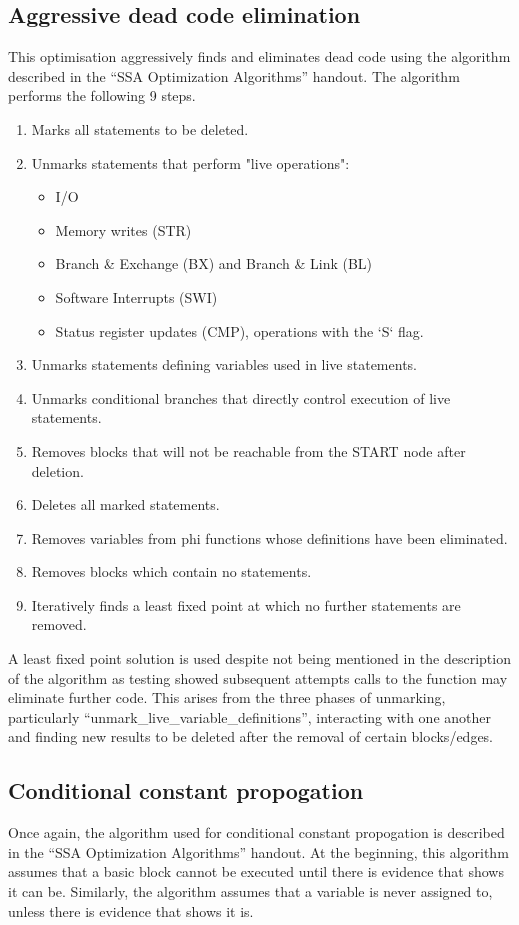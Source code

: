 \documentclass[a4paper,10pt]{report}
\begin{document}
\subsection{Aggressive dead code elimination}
This optimisation aggressively finds and eliminates dead code using the algorithm described in the ``SSA Optimization 
Algorithms'' handout. The algorithm performs the following 9 steps.
\begin{enumerate}
\item Marks all statements to be deleted.
\item Unmarks statements that perform "live operations":
  \begin{itemize}
  \item I/O
  \item Memory writes (STR)
  \item Branch \& Exchange (BX) and Branch \& Link (BL)
  \item Software Interrupts (SWI)
  \item Status register updates (CMP), operations with the `S` flag.
  \end{itemize}
\item Unmarks statements defining variables used in live statements.
\item Unmarks conditional branches that directly control execution of live statements.
\item Removes blocks that will not be reachable from the START node after deletion.
\item Deletes all marked statements.
\item Removes variables from phi functions whose definitions have been eliminated.
\item Removes blocks which contain no statements.
\item Iteratively finds a least fixed point at which no further statements are removed.
\end{enumerate}
A least fixed point solution is used despite not being mentioned in the description of the algorithm as testing showed
subsequent attempts calls to the function may eliminate further code. This arises from the three phases of unmarking,
particularly ``unmark\_live\_variable\_definitions'', interacting with one another and finding new results to be deleted 
after the removal of certain blocks/edges.

\subsection{Conditional constant propogation}
Once again, the algorithm used for conditional constant propogation is described in the ``SSA Optimization Algorithms'' handout.
At the beginning, this algorithm assumes that a basic block cannot be executed until there is evidence that shows it can be.
Similarly, the algorithm assumes that a variable is never assigned to, unless there is evidence that shows it is.
\end{document}
